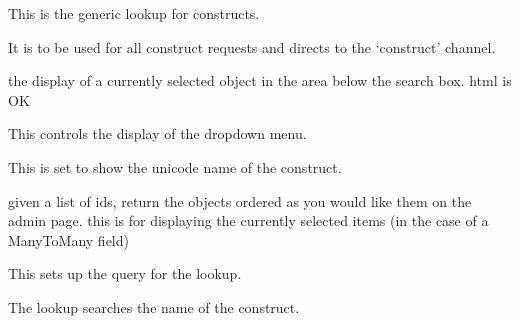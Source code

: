 \documentclass[letterpaper,10pt,english]{sphinxmanual}
\begin{document}

\begin{fulllineitems}
\label{api:experimentdb.reagents.lookups.ConstructLookup}
This is the generic lookup for constructs.


It is to be used for all construct requests and directs to the `construct' channel.


\begin{fulllineitems}
\label{api:experimentdb.reagents.lookups.ConstructLookup.format_item}
the display of a currently selected object in the area below the search box. html is OK


\end{fulllineitems}


\begin{fulllineitems}
\label{api:experimentdb.reagents.lookups.ConstructLookup.format_result}
This controls the display of the dropdown menu.


This is set to show the unicode name of the construct.


\end{fulllineitems}


\begin{fulllineitems}
\label{api:experimentdb.reagents.lookups.ConstructLookup.get_objects}
given a list of ids, return the objects ordered as you would like them on the admin page.
this is for displaying the currently selected items (in the case of a ManyToMany field)


\end{fulllineitems}


\begin{fulllineitems}
\label{api:experimentdb.reagents.lookups.ConstructLookup.get_query}
This sets up the query for the lookup.


The lookup searches the name of the construct.


\end{fulllineitems}


\end{fulllineitems}
\end{document}
